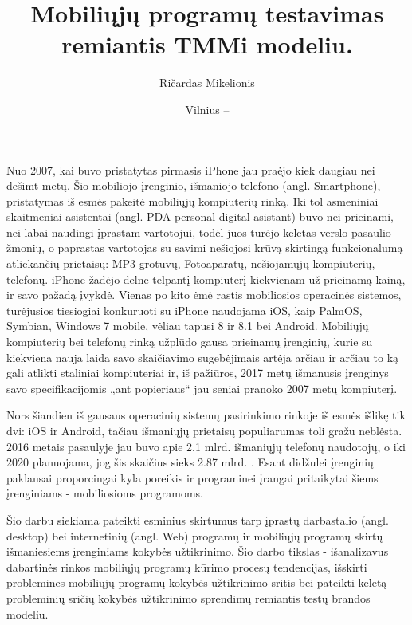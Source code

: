 \documentclass{VUMIFPSkursinis}
\title{Mobiliųjų programų testavimas remiantis TMMi modeliu.}
\author{Ričardas Mikelionis}
\date{Vilnius – \the\year}
\begin{document}
\maketitle

\cleardoublepage
{}
\tableofcontents
\cleardoublepage
{}

Nuo 2007, kai buvo pristatytas pirmasis iPhone jau praėjo kiek daugiau nei dešimt metų. Šio mobiliojo įrenginio, išmaniojo telefono (angl. Smartphone), pristatymas  iš esmės pakeitė mobiliųjų kompiuterių rinką. Iki tol asmeniniai skaitmeniai asistentai (angl. PDA personal digital asistant) buvo nei prieinami, nei labai naudingi įprastam vartotojui, todėl juos turėjo keletas verslo pasaulio žmonių, o paprastas vartotojas su savimi nešiojosi krūvą skirtingą funkcionalumą atliekančių prietaisų: MP3 grotuvų, Fotoaparatų, nešiojamųjų kompiuterių, telefonų. iPhone žadėjo delne telpantį kompiuterį kiekvienam už prieinamą kainą, ir savo pažadą įvykdė. Vienas po kito ėmė rastis  mobiliosios operacinės sistemos, turėjusios tiesiogiai konkuruoti su iPhone naudojama iOS,  kaip PalmOS, Symbian, Windows 7 mobile, vėliau tapusi 8 ir 8.1 bei Android. Mobiliųjų kompiuterių bei telefonų rinką užplūdo gausa prieinamų įrenginių, kurie su kiekviena nauja laida savo skaičiavimo sugebėjimais artėja arčiau ir arčiau to ką gali atlikti staliniai kompiuteriai ir, iš pažiūros, 2017 metų išmanusis įrenginys savo specifikacijomis „ant popieriaus“ jau seniai pranoko 2007 metų kompiuterį.

Nors šiandien iš gausaus operacinių sistemų pasirinkimo rinkoje iš esmės išlikę tik dvi: iOS ir Android, tačiau  išmaniųjų prietaisų populiarumas toli gražu neblėsta. 2016 metais pasaulyje jau buvo apie 2.1 mlrd. išmaniųjų telefonų naudotojų, o iki 2020 planuojama, jog šis skaičius sieks 2.87 mlrd. \cite{statista.com}. Esant didžulei įrenginių paklausai proporcingai kyla poreikis ir programinei įrangai pritaikytai šiems įrenginiams - mobiliosioms programoms.

Šio darbu siekiama pateikti esminius skirtumus tarp įprastų darbastalio (angl. desktop) bei internetinių (angl. Web) programų ir mobiliųjų programų skirtų išmaniesiems įrenginiams kokybės užtikrinimo. Šio darbo tikslas - išanalizavus dabartinės rinkos mobiliųjų programų kūrimo procesų tendencijas, išskirti problemines mobiliųjų programų kokybės užtikrinimo sritis bei pateikti keletą probleminių sričių kokybės užtikrinimo sprendimų remiantis testų brandos modeliu.
\end{document}

